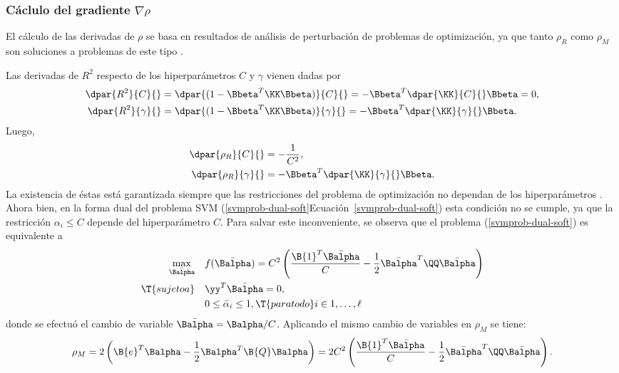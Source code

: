 %
\subsubsection{Cáclulo del gradiente $\nabla\rho$}
%
El cálculo de las derivadas de $\rho$ se basa en resultados de
análisis de perturbación de problemas de optimización, ya que tanto
$\rho_R$ como $\rho_M$ son soluciones a problemas de este tipo
\cite{chung}.

Las derivadas de $R^2$ respecto de los hiperparámetros $C$ y $\gamma$
vienen dadas por
%
\begin{align}
  \dpar{R^2}{C}{} &= \dpar{(1-\Bbeta^T\KK\Bbeta)}{C}{}
  = -\Bbeta^T \dpar{\KK}{C}{}\Bbeta = 0, \\
  \dpar{R^2}{\gamma}{} &= \dpar{(1-\Bbeta^T\KK\Bbeta)}{\gamma}{}
  = -\Bbeta^T \dpar{\KK}{\gamma}{}\Bbeta.
\end{align}
%
Luego,
%
\begin{align}
  \dpar{\rho_R}{C}{} &= -\frac{1}{C^2}, \\
  \dpar{\rho_R}{\gamma}{} &= -\Bbeta^T \dpar{\KK}{\gamma}{}\Bbeta.
\end{align}
%
La existencia de éstas está garantizada siempre que las restricciones
del problema de optimización no dependan de los hiperparámetros
\cite{chung}.
Ahora bien, en la forma dual del problema SVM
(\iflatexml\autoref{svmprob-dual-soft}\else{}Ecuación~\ref{svmprob-dual-soft}\fi)
esta condición no se cumple, ya que la restricción $\alpha_i\leq{}C$
depende del hiperparámetro $C$.
Para salvar este inconveniente, se observa que el problema
(\ref{svmprob-dual-soft}) es equivalente a
%
\begin{align}
\begin{split}
    \max_{\bar{\Balpha}}\quad&
    f(\bar{\Balpha}) = C^2 \left( \frac{\B{1}^T\bar{\Balpha}}{C}
    -\frac{1}{2}\bar{\Balpha}^T\QQ\bar{\Balpha}\right)\\
    \T{sujeto a}\quad & \yy^T\bar{\Balpha} = 0, \\
    & 0\leq\bar{\alpha}_i\leq 1,
    \T{ para todo } i\in {1,\ldots,\ell }
\end{split}
\end{align}
%
donde se efectuó el cambio de variable $\bar{\Balpha}=\Balpha/C$.
Aplicando el mismo cambio de variables en $\rho_M$ se tiene:
%
\begin{align}
  \label{eq:rmb-alpha-equiv}
  \rho_M=2\left(\B{e}^T\Balpha-\frac{1}{2}\Balpha^T\B{Q}\Balpha\right)
  = 2C^2\left(\frac{\B{1}^T\bar{\Balpha}}{C} -
  \frac{1}{2}\bar{\Balpha}^T\QQ\bar{\Balpha}\right).
\end{align}

